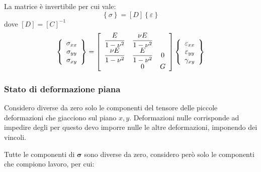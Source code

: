 La matrice è invertibile per cui vale:
\begin{equation*}
    \left\{\sigma\right\}=[D] \left\{\varepsilon\right\}
\end{equation*}
dove $[D] = [C]^{-1}$
\begin{equation*}
\left\{
\begin{array}{c}
\sigma_{xx} \\
\sigma_{yy} \\
\sigma_{xy}
\end{array}
\right\}
=
\left[
\begin{array}{ccc}
\displaystyle \frac{E}{1-\nu^2} & \displaystyle \frac{\nu E}{1-\nu^2} & \\
\displaystyle \frac{\nu E}{1-\nu^2} & \displaystyle \frac{E}{1-\nu^2} & \large{0} \\
& \large{0} & G
\end{array}
\right]
\left\{
\begin{array}{c}
\varepsilon_{xx} \\
\varepsilon_{yy} \\
\gamma_{xy}
\end{array}
\right\}
\end{equation*}

\subsubsection*{Stato di deformazione piana}
Considero diverse da zero solo le componenti del tensore delle piccole deformazioni che giacciono sul piano $x,y$. Deformazioni nulle corrisponde ad impedire degli per questo devo imporre nulle le altre deformazioni, imponendo dei vincoli.

Tutte le componenti di $\boldsymbol{\sigma} $ sono diverse da zero, considero però solo le componenti che compiono lavoro, per cui:


